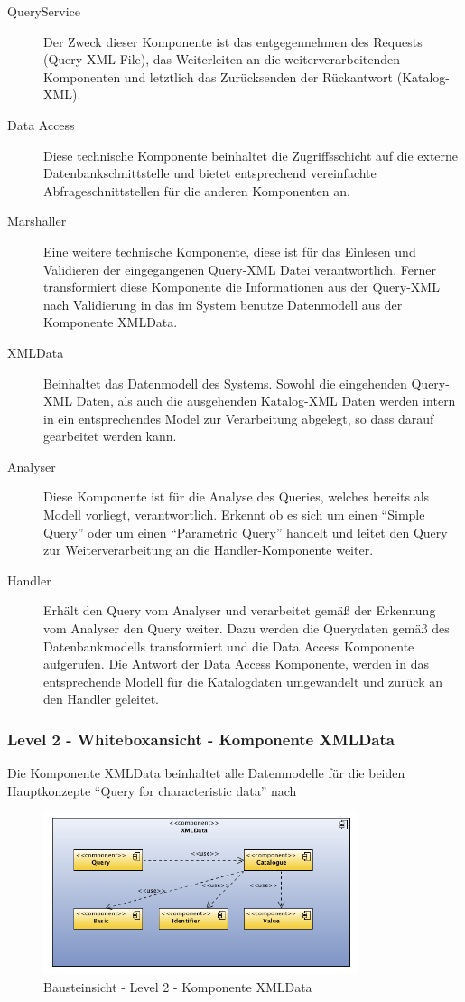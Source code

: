 \begin{description}
\item[QueryService] Der Zweck dieser Komponente ist das entgegennehmen des Requests (Query-XML File), das Weiterleiten an die weiterverarbeitenden Komponenten und letztlich das Zurücksenden der Rückantwort (Katalog-XML).
\item[Data Access] Diese technische Komponente beinhaltet die Zugriffsschicht auf die externe Datenbankschnittstelle und bietet entsprechend vereinfachte Abfrageschnittstellen für die anderen Komponenten an. 
\item[Marshaller] Eine weitere technische Komponente, diese ist für das Einlesen und Validieren der eingegangenen Query-XML Datei verantwortlich. Ferner transformiert diese Komponente die Informationen aus der Query-XML nach Validierung in das im System benutze Datenmodell aus der Komponente XMLData.
\item[XMLData] Beinhaltet das Datenmodell des Systems. Sowohl die eingehenden Query-XML Daten, als auch die ausgehenden Katalog-XML Daten werden intern in ein entsprechendes Model zur Verarbeitung abgelegt, so dass darauf gearbeitet werden kann.  
\item[Analyser] Diese Komponente ist für die Analyse des Queries, welches bereits als Modell vorliegt, verantwortlich. Erkennt ob es sich um einen \enquote{Simple Query} oder um einen \enquote{Parametric Query} handelt und leitet den Query zur Weiterverarbeitung an die Handler-Komponente weiter. 
\item[Handler] Erhält den Query vom Analyser und verarbeitet gemäß der Erkennung vom Analyser den Query weiter. Dazu werden die Querydaten gemäß des Datenbankmodells transformiert und die Data Access Komponente aufgerufen. Die Antwort der Data Access Komponente, werden in das entsprechende Modell für die Katalogdaten umgewandelt und zurück an den Handler geleitet.  
\end{description}

\subsubsection{Level 2 - Whiteboxansicht - Komponente XMLData} 

Die Komponente XMLData beinhaltet alle Datenmodelle für die beiden Hauptkonzepte \enquote{Query for characteristic data} nach 

\begin{figure}[htbp]
	\centering
		\includegraphics[width=0.82\textwidth]{images/bausteinsicht_plib_level2_xmldata.png}
	\caption{Bausteinsicht - Level 2 - Komponente XMLData}
	\label{fig:bausteinsicht_level2_xmldata}
\end{figure}

